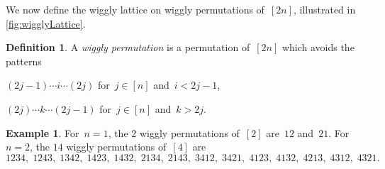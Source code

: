 \documentclass[submission]{FPSAC2025}
\theoremstyle{definition}
\newtheorem{definition}[theorem]{Definition}
\newtheorem{example}[theorem]{Example}
\newcommand{\darkblue}{\color{darkblue}} %
\newcommand{\defn}[1]{\textsl{\darkblue #1}} %
\begin{document}
We now define the wiggly lattice on wiggly permutations of~$[2n]$, illustrated in \cref{fig:wigglyLattice}.

\begin{definition}
\label{def:wigglyPermutation}
A \defn{wiggly permutation} is a permutation of~$[2n]$ which avoids the patterns
\begin{compactitem}
\item $(2j-1) \cdots i \cdots (2j)$ for~$j \in [n]$ and~$i < 2j-1$,
\item $(2j) \cdots k \cdots (2j-1)$ for~$j \in [n]$ and~$k > 2j$.
\end{compactitem}
\end{definition}

\begin{example}
\label{exm:allSmallWigglyPermutations}
For~$n = 1$, the $2$ wiggly permutations of~$[2]$ are~$12$ and~$21$.
For~$n = 2$, the $14$ wiggly permutations of~$[4]$ are
\[
1234, \; 1243, \; 1342, \; 1423, \; 1432, \; 2134, \; 2143, \; 3412, \; 3421, \; 4123, \; 4132, \; 4213, \; 4312, \; 4321.
\]
\end{example}
\end{document}

